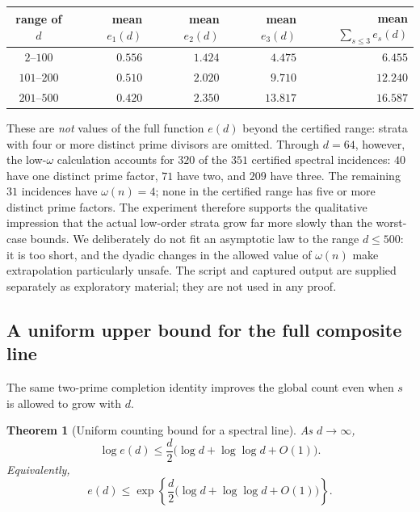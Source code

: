 \documentclass[11pt]{article}
\newtheorem{theorem}{Theorem}[section]
\begin{document}
\begin{center}
\begin{tabular}{c|rrrr}
\toprule
range of $d$ & mean $e_1(d)$ & mean $e_2(d)$ & mean $e_3(d)$
& mean $\sum_{s\le3}e_s(d)$\\
\midrule
$2$--$100$   & $0.556$ & $1.424$ & $4.475$ & $6.455$\\
$101$--$200$ & $0.510$ & $2.020$ & $9.710$ & $12.240$\\
$201$--$500$ & $0.420$ & $2.350$ & $13.817$ & $16.587$\\
\bottomrule
\end{tabular}
\end{center}

These are \emph{not} values of the full function $e(d)$ beyond the certified
range: strata with four or more distinct prime divisors are omitted.  Through $d=64$, however, the low-$\omega$ calculation accounts for $320$ of the $351$ certified spectral incidences: $40$ have one distinct prime factor, $71$ have two, and $209$ have three.  The remaining $31$ incidences have $\omega(n)=4$; none in the certified range has five or more distinct prime factors.  The experiment therefore
supports the qualitative impression that the actual low-order strata grow far
more slowly than the worst-case bounds.  We deliberately do not fit an
asymptotic law to the range $d\le500$: it is too short, and the dyadic changes
in the allowed value of $\omega(n)$ make extrapolation particularly unsafe.
The script and captured output are supplied separately as exploratory material;
they are not used in any proof.

\subsection{A uniform upper bound for the full composite line}

The same two-prime completion identity improves the global count even when
$s$ is allowed to grow with $d$.

\begin{theorem}[Uniform counting bound for a spectral line]
\label{thm:uniform-e-count}
As $d\to\infty$,
\begin{equation}
\boxed{
\log e(d)
\le
\frac d2\bigl(\log d+\log\log d+O(1)\bigr).
}
\label{eq:uniform-e-count}
\end{equation}
Equivalently,
\[
e(d)\le
\exp\!\left\{
\frac d2\bigl(\log d+\log\log d+O(1)\bigr)
\right\}.
\]
\end{theorem}
\end{document}
